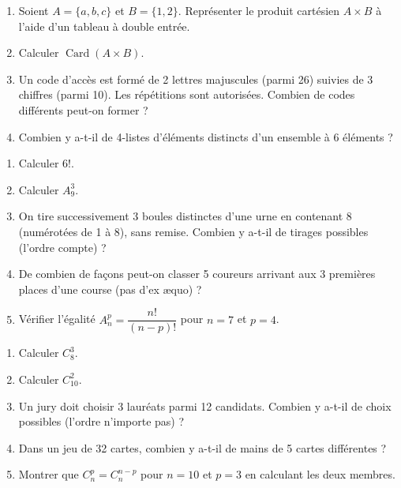 \documentclass[11pt]{article}
\begin{document}
\begin{exercice}
\begin{enumerate}
    \item Soient $A = \{a, b, c\}$ et $B = \{1, 2\}$. Représenter le produit cartésien $A \times B$ à l'aide d'un tableau à double entrée.
    \item Calculer $\operatorname{Card}(A \times B)$.
    \item Un code d'accès est formé de 2 lettres majuscules (parmi 26) suivies de 3 chiffres (parmi 10). Les répétitions sont autorisées. Combien de codes différents peut-on former ?
    \item Combien y a-t-il de 4-listes d'éléments distincts d'un ensemble à 6 éléments ?
\end{enumerate}
\end{exercice}

\begin{exercice}
\begin{enumerate}
    \item Calculer $6!$.
    \item Calculer $A_9^3$.
    \item On tire successivement 3 boules distinctes d'une urne en contenant 8 (numérotées de 1 à 8), sans remise. Combien y a-t-il de tirages possibles (l'ordre compte) ?
    \item De combien de façons peut-on classer 5 coureurs arrivant aux 3 premières places d'une course (pas d'ex æquo) ?
    \item Vérifier l'égalité $A_n^p = \dfrac{n!}{(n-p)!}$ pour $n=7$ et $p=4$.
\end{enumerate}
\end{exercice}

\begin{exercice}[Combinaisons]
\begin{enumerate}
    \item Calculer $C_8^3$.
    \item Calculer $C_{10}^2$.
    \item Un jury doit choisir 3 lauréats parmi 12 candidats. Combien y a-t-il de choix possibles (l'ordre n'importe pas) ?
    \item Dans un jeu de 32 cartes, combien y a-t-il de mains de 5 cartes différentes ?
    \item Montrer que $C_n^p = C_n^{n-p}$ pour $n=10$ et $p=3$ en calculant les deux membres.
\end{enumerate}
\end{exercice}
\end{document}
